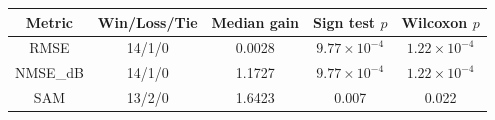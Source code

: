 \begin{tabular}{c c c c c}
\toprule
Metric & Win/Loss/Tie & Median gain & Sign test $p$ & Wilcoxon $p$ \\
\midrule
RMSE & 14/1/0 & 0.0028 & $9.77 \times 10^{-4}$ & $1.22 \times 10^{-4}$ \\
NMSE\_dB & 14/1/0 & 1.1727 & $9.77 \times 10^{-4}$ & $1.22 \times 10^{-4}$ \\
SAM & 13/2/0 & 1.6423 & 0.007 & 0.022 \\
\bottomrule
\end{tabular}
